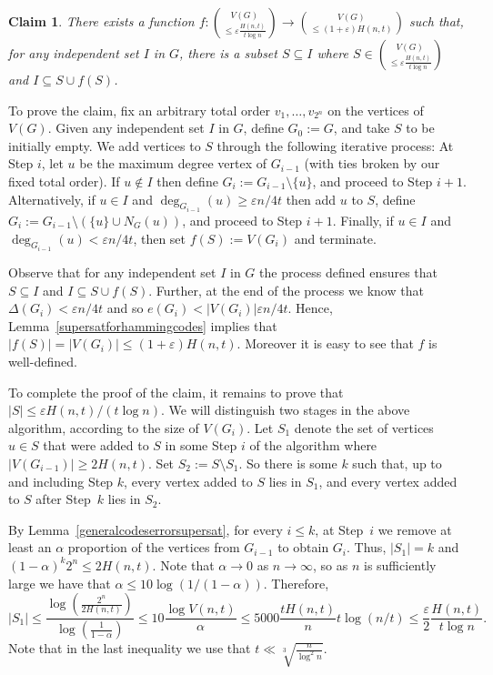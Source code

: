 \documentclass[11pt]{article}
\newtheorem{claim}[theorem]{Claim}
\numberwithin{equation}{section}
\def\eps{\varepsilon}
\begin{document}
\begin{claim}\label{claimc} 
There exists a function $f : \binom{V(G)}{\leq \eps\frac{H(n,t)}{t\log n}} \to \binom{V(G)}{\leq (1+\eps)H(n,t)}$  such that, for any independent set $I$ in $G$, there is a subset $S \subseteq I$ where 
$S \in \binom{V(G)}{\leq \eps\frac{H(n,t)}{t\log n}} $
 and   $I \subseteq S \cup f(S)$. 
\end{claim}
To prove the claim, fix an arbitrary total order $v_1, \dots, v_{2^n}$ on the vertices of $V(G)$. Given any independent set $I$ in $G$, define $G_0 := G$, and take $S$  to be initially empty. We add vertices to $S$  through the following iterative process:
 At Step $i$, let $u$ be the maximum degree vertex of $G_{i-1}$ (with ties broken by our fixed total order). If $u \notin I$ then define $G_i := G_{i-1} \setminus \{u\}$, and proceed to Step $i+1$. Alternatively, if $u \in I$ and $\deg_{G_{i-1}}(u) \geq \eps {n}/{4t}$ then add $u$ to $S$, define $G_i := G_{i-1} \setminus (\{u\} \cup N_G(u))$, and proceed to Step $i+1$. Finally, if $u \in I$ and $\deg_{G_{i-1}}(u) <  \eps {n}/{4t}$, then set $f(S) := V(G_i)$ and terminate.

Observe that for any independent set $I $ in $G$ the process defined ensures that $S \subseteq I$  and $I \subseteq S \cup f(S)$. Further, at the end of the process we know that
$\Delta (G_i) < \eps {n}/{4t}$ and so $e(G_i)< |V(G_i)| \eps {n}/{4t}$. Hence, Lemma~\ref{supersatforhammingcodes} implies that $|f(S)|=|V(G_i)|\leq (1+\eps)H(n,t)$. Moreover it is easy to see that $f$ is well-defined.

To complete the proof of the claim, it 
remains to prove that $|S|\leq \eps {H(n,t)}/({t\log n})$.
We will distinguish two stages in the above algorithm, according to the size of $V(G_i)$. Let $S_1$ denote the set of vertices $u \in S$ that were added to $S$ in some Step $i$ of the algorithm where $|V(G_{i-1})|\geq 2 H(n,t)$. Set $S_2 :=S \setminus S_1$.
So there is some $k$ such that, up to and including Step $k$, every vertex added to $S$ lies in $S_1$, and every vertex added to $S$ after Step~$k$ lies in $S_2$.

By Lemma~\ref{generalcodeserrorsupersat}, for every $i \leq k$, at Step~$i$ we remove at least an $\alpha$ proportion of the vertices from $G_{i-1}$ to obtain $G_i$.
Thus, $|S_1|=k$ and $(1-\alpha)^k 2^n\leq 2H(n,t)$. Note that $\alpha \rightarrow 0$ as $n \rightarrow \infty$, so as $n$ is sufficiently large we have that $\alpha \leq 10 \log (1/(1-\alpha))$. 
Therefore,
$$|S_1|\leq \frac{\log \left(\frac{2^n}{2H(n,t)}\right)}{\log\left(\frac{1}{1-\alpha}\right)}\leq 10\frac{\log V(n,t)}{\alpha}\leq 5000\frac{tH(n,t)}{n}t\log(n/t)\leq \frac{\eps}{2} \frac{H(n,t)}{t\log n}.$$
Note that in the last inequality we use that $t\ll \sqrt[3]{\frac{ n}{\log^2 n}}$.
\end{document}
